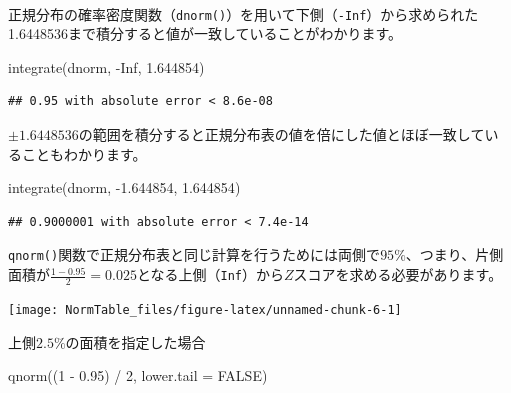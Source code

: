 \documentclass[]{tufte-handout}
\newenvironment{Shaded}{}{}
\newcommand{\AttributeTok}[1]{\textcolor[rgb]{0.49,0.56,0.16}{#1}}
\newcommand{\ConstantTok}[1]{\textcolor[rgb]{0.53,0.00,0.00}{#1}}
\newcommand{\DecValTok}[1]{\textcolor[rgb]{0.25,0.63,0.44}{#1}}
\newcommand{\FloatTok}[1]{\textcolor[rgb]{0.25,0.63,0.44}{#1}}
\newcommand{\FunctionTok}[1]{\textcolor[rgb]{0.02,0.16,0.49}{#1}}
\newcommand{\NormalTok}[1]{#1}
\newcommand{\SpecialCharTok}[1]{\textcolor[rgb]{0.25,0.44,0.63}{#1}}
\begin{document}
　\\
正規分布の確率密度関数（\texttt{dnorm()}）を用いて下側（\texttt{-Inf}）から求められた1.6448536まで積分すると値が一致していることがわかります。

\begin{Shaded}
\begin{Highlighting}[numbers=left,,]
\FunctionTok{integrate}\NormalTok{(dnorm, }\SpecialCharTok{{-}}\ConstantTok{Inf}\NormalTok{, }\FloatTok{1.644854}\NormalTok{)}
\end{Highlighting}
\end{Shaded}

\begin{verbatim}
## 0.95 with absolute error < 8.6e-08
\end{verbatim}

\(\pm1.6448536\)の範囲を積分すると正規分布表の値を倍にした値とほぼ一致していることもわかります。

\begin{Shaded}
\begin{Highlighting}[numbers=left,,]
\FunctionTok{integrate}\NormalTok{(dnorm, }\SpecialCharTok{{-}}\FloatTok{1.644854}\NormalTok{, }\FloatTok{1.644854}\NormalTok{)}
\end{Highlighting}
\end{Shaded}

\begin{verbatim}
## 0.9000001 with absolute error < 7.4e-14
\end{verbatim}

\newpage

\texttt{qnorm()}関数で正規分布表と同じ計算を行うためには両側で\(95\%\)、つまり、片側面積が\(\frac{1 - 0.95}{2} = 0.025\)となる上側（\texttt{Inf}）から\(Z\)スコアを求める必要があります。

\begin{marginfigure}

{\centering \texttt{[image: NormTable\_files/figure-latex/unnamed-chunk-6-1]} 

}

\caption[上側$2.5\%$の面積を指定した場合]{上側$2.5\%$の面積を指定した場合}\label{fig:unnamed-chunk-6}
\end{marginfigure}

\begin{Shaded}
\begin{Highlighting}[numbers=left,,]
\FunctionTok{qnorm}\NormalTok{((}\DecValTok{1} \SpecialCharTok{{-}} \FloatTok{0.95}\NormalTok{) }\SpecialCharTok{/} \DecValTok{2}\NormalTok{, }\AttributeTok{lower.tail =} \ConstantTok{FALSE}\NormalTok{)}
\end{Highlighting}
\end{Shaded}
\end{document}
